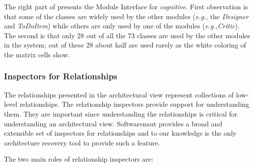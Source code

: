 \documentclass[preprint,12pt]{elsarticle}
\newcommand{\cd}[1]{{\em{#1}}}
\newcommand{\eg}{\emph{e.g.},\xspace}
\begin{document}
\begin{itemize}
The right part of  presents the Module Interface for \cd{cognitive}. First observation is that some of the classes are widely used by the other modules (\eg the \cd{Designer} and \cd{ToDoItem}) while others are only used by one of the modules (\eg \cd{Critic}). The second is that only 28 out of all the 73 classes are used by the other modules in the system; out of these 28 about half are used rarely as the white coloring of the matrix cells show.
\end{itemize}

\subsubsection {Inspectors for Relationships}

The relationships presented in the architectural view represent collections of low-level relationships. The relationship inspectors provide support for understanding them. They are important since understanding the relationships is critical for understanding an architectural view. Softwarenaut provides a broad and extensible set of inspectors for relationships \cite{lungu-cutedge, lungu-relevo} and to our knowledge is the only architecture recovery tool to provide such a feature. 

The two main roles of relationship inspectors are:
\end{document}
